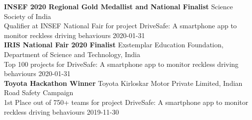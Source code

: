 \documentclass[a4paper]{article}
\begin{document}
\textbf{INSEF 2020 Regional Gold Medallist and National Finalist} \hfill Science Society of India\\
Qualifier at INSEF National Fair for project \textquotedbl{}DriveSafe: A smartphone app to monitor reckless driving behaviours\textquotedbl{} \hfill 2020-01-31\\
\vspace*{2mm}
\textbf{IRIS National Fair 2020 Finalist} \hfill Exstemplar Education Foundation, Department of Science and Technology, India\\
Top 100 projects for \textquotedbl{}DriveSafe: A smartphone app to monitor reckless driving behaviours\textquotedbl{} \hfill 2020-01-31\\
\vspace*{2mm}
\textbf{Toyota Hackathon Winner} \hfill Toyota Kirloskar Motor Private Limited, Indian Road Safety Campaign\\
1st Place out of 750+ teams for project \textquotedbl{}DriveSafe: A smartphone app to monitor reckless driving behaviours\textquotedbl{} \hfill 2019-11-30\\
\vspace*{2mm}

\ 
\end{document}
